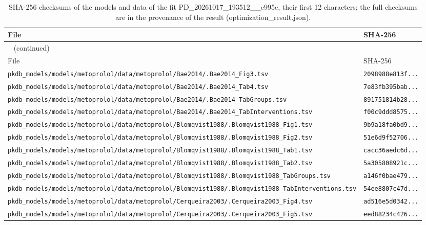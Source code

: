 \documentclass{article}
\begin{document}
\begin{longtable}{ll}
\caption{SHA-256 checksums of the models and data of the fit PD\_20261017\_193512\_\_e995e, their first 12 characters; the full checksums are in the provenance of the result (optimization\_result.json).}\label{tab:checksums:PD_20261017_193512__e995e} \\
\toprule
File & SHA-256 \\
\midrule
\endfirsthead
\multicolumn{2}{l}{\small\tablename~\thetable{} (continued)} \\
\toprule
File & SHA-256 \\
\midrule
\endhead
\bottomrule
\endlastfoot
\texttt{pkdb\_models/models/metoprolol/data/metoprolol/Bae2014/.Bae2014\_Fig3.tsv} & \texttt{2098988e813f...} \\
\texttt{pkdb\_models/models/metoprolol/data/metoprolol/Bae2014/.Bae2014\_Tab4.tsv} & \texttt{7e83fb395bab...} \\
\texttt{pkdb\_models/models/metoprolol/data/metoprolol/Bae2014/.Bae2014\_TabGroups.tsv} & \texttt{891751814b28...} \\
\texttt{pkdb\_models/models/metoprolol/data/metoprolol/Bae2014/.Bae2014\_TabInterventions.tsv} & \texttt{f00c9ddd8575...} \\
\texttt{pkdb\_models/models/metoprolol/data/metoprolol/Blomqvist1988/.Blomqvist1988\_Fig1.tsv} & \texttt{9b9a18fa0bd9...} \\
\texttt{pkdb\_models/models/metoprolol/data/metoprolol/Blomqvist1988/.Blomqvist1988\_Fig2.tsv} & \texttt{51e6d9f52706...} \\
\texttt{pkdb\_models/models/metoprolol/data/metoprolol/Blomqvist1988/.Blomqvist1988\_Tab1.tsv} & \texttt{cacc36aedc6d...} \\
\texttt{pkdb\_models/models/metoprolol/data/metoprolol/Blomqvist1988/.Blomqvist1988\_Tab2.tsv} & \texttt{5a305808921c...} \\
\texttt{pkdb\_models/models/metoprolol/data/metoprolol/Blomqvist1988/.Blomqvist1988\_TabGroups.tsv} & \texttt{a146f0bae479...} \\
\texttt{pkdb\_models/models/metoprolol/data/metoprolol/Blomqvist1988/.Blomqvist1988\_TabInterventions.tsv} & \texttt{54ee8807c47d...} \\
\texttt{pkdb\_models/models/metoprolol/data/metoprolol/Cerqueira2003/.Cerqueira2003\_Fig4.tsv} & \texttt{ad516e5d0342...} \\
\texttt{pkdb\_models/models/metoprolol/data/metoprolol/Cerqueira2003/.Cerqueira2003\_Fig5.tsv} & \texttt{eed88234c426...} \\

\end{longtable}
\end{document}
